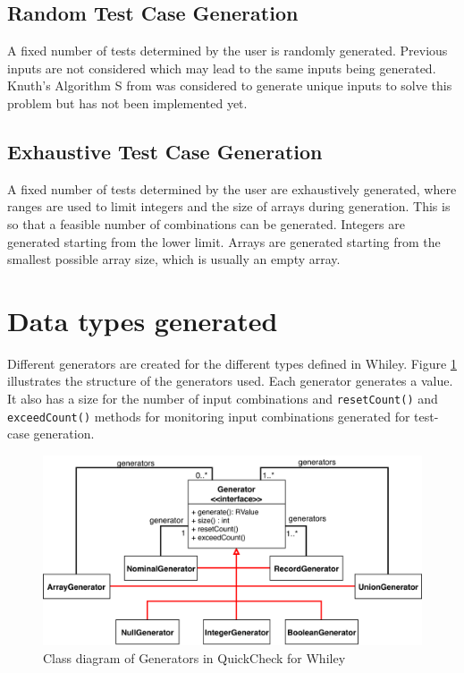 \subsection{Random Test Case Generation}

A fixed number of tests determined by the user is randomly generated. Previous inputs are not considered which may lead to the same inputs being generated.
Knuth's Algorithm S from \cite{artProgv2} was considered to generate unique inputs to solve this problem but has not been implemented yet.

\subsection{Exhaustive Test Case Generation}
A fixed number of tests determined by the user are exhaustively generated, where ranges are used to limit integers and the size of arrays during generation. This is so that a feasible number of combinations can be generated. Integers are generated starting from the lower limit. Arrays are generated starting from the smallest possible array size, which is usually an empty array.

\section{Data types generated}
Different generators are created for the different types defined in Whiley. 
Figure \ref{fig:qc-generators} illustrates the structure of the generators used.
Each generator generates a value. It also has a size for the number of input combinations and \texttt{resetCount()} and \texttt{exceedCount()} methods for monitoring input combinations generated for test-case generation.
 
\begin{figure}
	\label{fig:qc-generators}
	\includegraphics[width=\textwidth]{qc-generators}
	\centering
	\caption{Class diagram of Generators in QuickCheck for Whiley}
\end{figure}


